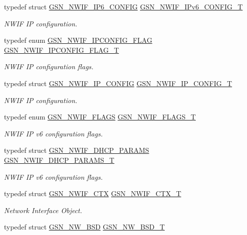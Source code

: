 \begin{DoxyCompactItemize}
typedef struct \hyperlink{a00171}{GSN\_\-NWIF\_\-IP6\_\-CONFIG} \hyperlink{a00670_gab09a924a18be9757c337786abe5903f0}{GSN\_\-NWIF\_\-IPv6\_\-CONFIG\_\-T}
\begin{DoxyCompactList}\small\item\em NWIF IP configuration. \end{DoxyCompactList}\item 
typedef enum \hyperlink{a00670_gaa290d30cd14afde370ebe3cc0bc80713}{GSN\_\-NWIF\_\-IPCONFIG\_\-FLAG} \hyperlink{a00670_ga952c642f49bc1ff0ab65d34c4843b5e9}{GSN\_\-NWIF\_\-IPCONFIG\_\-FLAG\_\-T}
\begin{DoxyCompactList}\small\item\em NWIF IP configuration flags. \end{DoxyCompactList}\item 
typedef struct \hyperlink{a00172}{GSN\_\-NWIF\_\-IP\_\-CONFIG} \hyperlink{a00670_ga72947a68a092d535f5989c7c5e2fe71b}{GSN\_\-NWIF\_\-IP\_\-CONFIG\_\-T}
\begin{DoxyCompactList}\small\item\em NWIF IP configuration. \end{DoxyCompactList}\item 
typedef enum \hyperlink{a00670_gaa0ec94e77c73c9648888a870bd0f041a}{GSN\_\-NWIF\_\-FLAGS} \hyperlink{a00670_ga2c209f2b9b6b2b6b0b2e1132acd45891}{GSN\_\-NWIF\_\-FLAGS\_\-T}
\begin{DoxyCompactList}\small\item\em NWIF IP v6 configuration flags. \end{DoxyCompactList}\item 
typedef struct \hyperlink{a00168}{GSN\_\-NWIF\_\-DHCP\_\-PARAMS} \hyperlink{a00670_ga9f9d4b76c96f7c8444291e1706c4fcff}{GSN\_\-NWIF\_\-DHCP\_\-PARAMS\_\-T}
\begin{DoxyCompactList}\small\item\em NWIF IP v6 configuration flags. \end{DoxyCompactList}\item 
typedef struct \hyperlink{a00167}{GSN\_\-NWIF\_\-CTX} \hyperlink{a00670_ga47d94474618770f1d7c6ef6b783b9d24}{GSN\_\-NWIF\_\-CTX\_\-T}
\begin{DoxyCompactList}\small\item\em Network Interface Object. \end{DoxyCompactList}\item 
typedef struct \hyperlink{a00163}{GSN\_\-NW\_\-BSD} \hyperlink{a00534_ac7a3fb17a7a529ae15ceec860b9db964}{GSN\_\-NW\_\-BSD\_\-T}

\end{DoxyCompactItemize}
